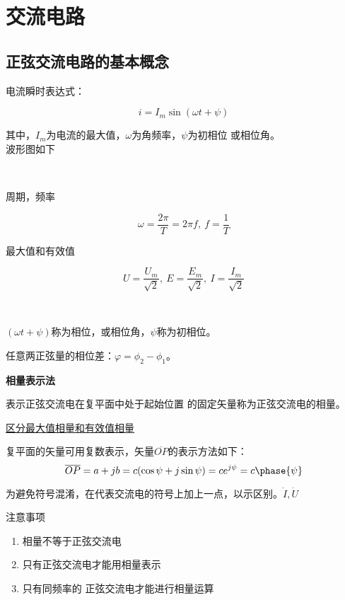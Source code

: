 \section{交流电路}

\subsection{正弦交流电路的基本概念}

电流瞬时表达式：

\[
    i=I_m\sin(\omega t+\psi)
\]

其中，$I_m$为电流的最大值，$\omega$为角频率，$\psi$为初相位
或相位角。\\
波形图如下




\

周期，频率

\[
    \omega=\frac{2\pi}{T}=2\pi f,~ f=\frac{1}{T}    
\]

最大值和有效值

\[
    U = \frac{U_m}{\sqrt{2}} ,~ 
    E = \frac{E_m}{\sqrt{2}} ,~
    I=\frac{I_m}{\sqrt{2}}
\]

\

$(\omega t + \psi)$称为相位，或相位角，$\psi$称为初相位。

任意两正弦量的相位差：$\varphi = \phi_2 - \phi_1$。

\large{\textbf{相量表示法}}

\begin{definition}
    表示正弦交流电在复平面中处于起始位置
的固定矢量称为正弦交流电的相量。
\end{definition}

\underline{
区分最大值相量和有效值相量
}

复平面的矢量可用复数表示，矢量$\overline{OP}$的表示方法如下：
\[
    \overline{OP}=a+jb = c(\cos \psi + j\sin \psi ) = ce^{j\psi}=c\phase{\psi}
\]

为避免符号混淆，在代表交流电的符号上加上一点，以示区别。$\dot{I},\dot{U}$

\large 注意事项
\normalsize
\begin{enumerate}
    \item 相量不等于正弦交流电
    \item 只有正弦交流电才能用相量表示
    \item 只有同频率的
    正弦交流电才能进行相量运算
\end{enumerate}

